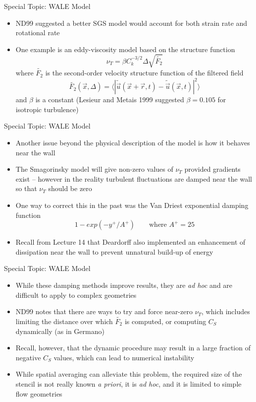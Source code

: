 \begin{frame}{Special Topic: WALE Model}
\begin{itemize}
	\item ND99 suggested a better SGS model would account for both strain rate and rotational rate
	\item One example is an eddy-viscosity model based on the structure function
	$$\nu_T = \beta C_k^{-3/2} \Delta \sqrt{\widetilde{F_2}}$$
	where $\widetilde{F_2}$ is the second-order velocity structure function of the filtered field
	$$\widetilde{F_2}(\vec{x},\Delta) = \langle |\widetilde{\vec{u}}(\vec{x}+\vec{r},t) - \widetilde{\vec{u}}(\vec{x},t)|^2\rangle$$
	and $\beta$ is a constant (Lesieur and Metais 1999 suggested $\beta = 0.105$ for isotropic turbulence)
\end{itemize}
\end{frame}
\begin{frame}{Special Topic: WALE Model}
\begin{itemize}
	\item Another issue beyond the physical description of the model is how it behaves near the wall
	\item The Smagorinsky model will give non-zero values of $\nu_T$ provided gradients exist -- however in the reality turbulent fluctuations are damped near the wall so that $\nu_T$ should be zero
	\item One way to correct this in the past was the Van Driest exponential damping function
	$$1 - exp({-y^+/A^+}) \qquad \text{where } A^+ = 25$$
	\item Recall from Lecture 14 that Deardorff also implemented an enhancement of dissipation near the wall to prevent unnatural build-up of energy
\end{itemize}
\end{frame}

\begin{frame}{Special Topic: WALE Model}
\begin{itemize}
	\item While these damping methods improve results, they are \textit{ad hoc} and are difficult to apply to complex geometries
	\item ND99 notes that there are ways to try and force near-zero $\nu_T$, which includes limiting the distance over which $\widetilde{F_2}$ is computed, or computing $C_S$ dynamically (as in Germano)
	\item Recall, however, that the dynamic procedure may result in a large fraction of negative $C_S$ values, which can lead to numerical instability
	\item While spatial averaging can alleviate this problem, the required size of the stencil is not really known \textit{a priori}, it is \textit{ad hoc}, and it is limited to simple flow geometries
\end{itemize}
\end{frame}

